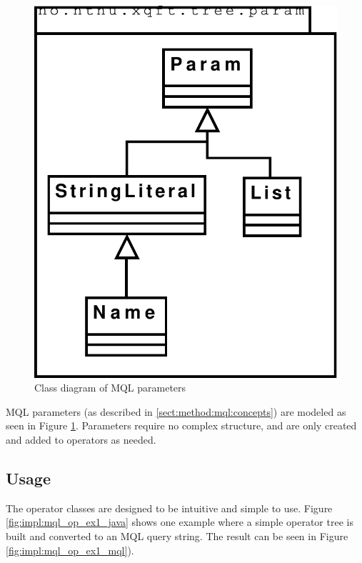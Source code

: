 \begin{figure}[!htp]
\begin{center}
  \includegraphics[scale=0.5]{diagrams/mql_param_uml}
  \caption{Class diagram of MQL parameters}
  \label{fig:impl:mql_param_uml}
\end{center}
\end{figure}

MQL parameters (as described in \ref{sect:method:mql:concepts}) are modeled as
seen in Figure \ref{fig:impl:mql_param_uml}. Parameters require no complex
structure, and are only created and added to operators as needed.

\subsection{Usage}
The operator classes are designed to be intuitive and simple to use. Figure
\ref{fig:impl:mql_op_ex1_java} shows one example where a simple operator tree
is built and converted to an MQL query string. The result can be seen in Figure \ref{fig:impl:mql_op_ex1_mql}).


